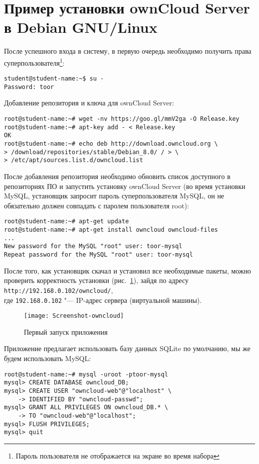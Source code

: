 \section{Пример установки ownCloud Server в Debian GNU/Linux} \label{pril:c}

После успешного входа в систему, в первую очередь необходимо получить права суперпользователя\footnote{Пароль пользователя не отображается на экране во время набора}:
\begin{lstlisting}
student@student-name:~$ su -
Password: toor
\end{lstlisting}

Добавление репозитория и ключа для ownCloud Server:
\begin{lstlisting}
root@student-name:~# wget -nv https://goo.gl/mmV2ga -O Release.key
root@student-name:~# apt-key add - < Release.key
OK
root@student-name:~# echo deb http://download.owncloud.org \
> /download/repositories/stable/Debian_8.0/ / > \
> /etc/apt/sources.list.d/owncloud.list
\end{lstlisting}

После добавления репозитория необходимо обновить список доступного в репозиториях ПО и запустить установку ownCloud Server (во время установки MySQL, установщик запросит пароль суперпользователя MySQL, он не обязательно должен совпадать с паролем пользователя root):
\begin{lstlisting}
root@student-name:~# apt-get update
root@student-name:~# apt-get install owncloud owncloud-files
...
New password for the MySQL "root" user: toor-mysql
Repeat password for the MySQL "root" user: toor-mysql
\end{lstlisting}

После того, как установщик скачал и установил все необходимые пакеты, можно проверить корректность установки (рис.~\ref{pic:first-own}), зайдя по адресу \texttt{http://192.168.0.102/owncloud/}, \\
где \texttt{192.168.0.102} "--- IP-адрес сервера (виртуальной машины).

\begin{figure}[ht]
    \centering
	\texttt{[image: Screenshot-owncloud]}
	\caption{Первый запуск приложения}\label{pic:first-own}
\end{figure}

Приложение предлагает использовать базу данных SQLite по умолчанию, мы же будем использовать MySQL:
\begin{lstlisting}
root@student-name:~# mysql -uroot -ptoor-mysql
mysql> CREATE DATABASE owncloud_DB;
mysql> CREATE USER "owncloud-web"@"localhost" \
    -> IDENTIFIED BY "owncloud-passwd";
mysql> GRANT ALL PRIVILEGES ON owncloud_DB.* \
    -> TO "owncloud-web"@"localhost";
mysql> FLUSH PRIVILEGES;
mysql> quit
\end{lstlisting}

